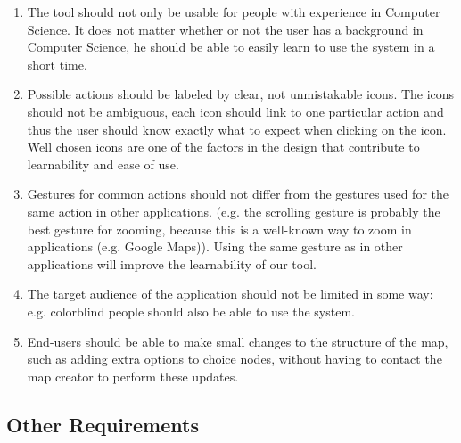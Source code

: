 \begin{enumerate}[label=\textbf{UR \arabic*}., ref=UR \arabic*, labelindent=0.5cm, leftmargin=*]

	\item \label{ur:intuitiveness}
		The tool should not only be usable for people with experience in Computer Science. It does not matter whether or not the user has a background in Computer Science, he should be able to easily learn to use the system in a short time.
	
	\item \label{ur:icons}
		Possible actions should be labeled by clear, not unmistakable icons. The icons should not be ambiguous, each icon should link to one particular action and thus the user should know exactly what to expect when clicking on the icon. Well chosen icons are one of the factors in the design that contribute to learnability and ease of use.
	
	\item \label{ur:gestures}
		Gestures for common actions should not differ from the gestures used for the same action in other applications. (e.g. the scrolling gesture is probably the best gesture for zooming, because this is a well-known way to zoom in applications (e.g. Google Maps)). Using the same gesture as in other applications will improve the learnability of our tool.
	
	\item \label{ur:accessibility}
		The target audience of the application should not be limited in some way: e.g. colorblind people should also be able to use the system.
	
	\item \label{ur:time}
		End-users should be able to make small changes to the structure of the map, such as adding extra options to choice nodes, without having to contact the map creator to perform these updates.
	
\end{enumerate}



\subsection{Other Requirements}\label{sec:other-requirements}

